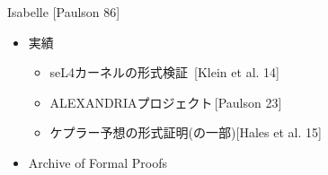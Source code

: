 \documentclass[17pt,aspectratio=169]{beamer}
\begin{document}

\begin{frame}{Isabelle {\small [Paulson 86]}}
    \vspace{-5pt}
    \begin{itemize}[itemsep=3pt]
        \item 実績
            \vspace{-3pt}
            \begin{itemize}[itemsep=2pt]
                \item seL4カーネルの形式検証 {\small \,[Klein et al. 14]}
                \item ALEXANDRIAプロジェクト{\small \,[Paulson 23]}
                \item ケプラー予想の形式証明{\small (の一部)[Hales et al. 15]}
                
            \end{itemize}
        \item Archive of Formal Proofs
    \end{itemize}
    

\end{frame}
\end{document}
